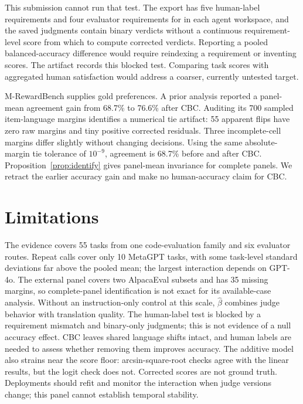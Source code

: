 \documentclass[sigconf,anonymous]{aamas}
\begin{document}
This submission cannot run that test. The export has five human-label
requirements and four evaluator requirements for
 in each agent workspace, and the saved
judgments contain binary verdicts without a continuous requirement-level score
from which to compute corrected verdicts. Reporting a pooled
balanced-accuracy difference would require reindexing a requirement or
inventing scores. The artifact records this blocked test. Comparing task
scores with aggregated human satisfaction would address a coarser,
currently untested target.

M-RewardBench supplies gold preferences. A prior analysis reported a
panel-mean agreement gain from 68.7\% to 76.6\% after CBC. Auditing its
700 sampled item-language margins identifies a numerical tie artifact:
55 apparent flips have zero raw margins and tiny positive corrected
residuals. Three incomplete-cell margins differ slightly without changing
decisions. Using the same absolute-margin tie tolerance of $10^{-9}$,
agreement is 68.7\% before and after CBC. Proposition~\ref{prop:identify}
gives panel-mean invariance for complete panels. We retract the earlier
accuracy gain and make no human-accuracy claim for CBC.

\section*{Limitations}

The evidence covers 55 tasks from one code-evaluation family and six
evaluator routes. Repeat calls cover only 10 MetaGPT tasks, with some
task-level standard deviations far above the pooled mean; the largest
interaction depends on GPT-4o. The external panel covers two AlpacaEval
subsets and has 35 missing margins, so complete-panel identification is
not exact for its available-case analysis. Without an instruction-only
control at this scale, $\hat\beta$ combines judge behavior with translation
quality. The human-label test is blocked by a requirement mismatch and
binary-only judgments; this is not evidence of a null accuracy effect.
CBC leaves shared language shifts intact, and human labels are needed to
assess whether removing them improves accuracy. The additive model also
strains near the score floor: arcsin-square-root checks agree with the
linear results, but the logit check does not. Corrected scores are not
ground truth. Deployments should refit and monitor the interaction when
judge versions change; this panel cannot establish temporal stability.
\end{document}
